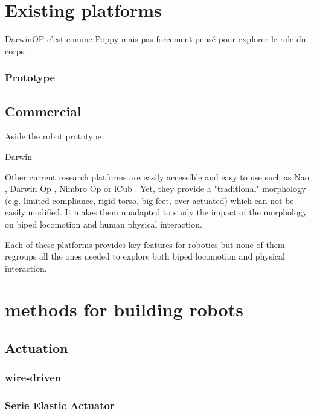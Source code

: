 \section{Existing platforms} %

DarwinOP c'est comme Poppy mais pas forcement pensé pour explorer le role du corps.

\subsubsection{Prototype} %

\subsection{Commercial} %

Aside the robot prototype,

Darwin \cite{ha2011development}

Other current research platforms are easily accessible and easy to use such as Nao \cite{gouaillier2008nao}, Darwin Op \cite{ha2011development}, Nimbro Op \cite{schwarznimbro} or iCub \cite{metta2008icub}. Yet, they provide a "traditional" morphology (e.g. limited compliance, rigid torso, big feet, over actuated) which can not be easily modified. It makes them unadapted to study the impact of the morphology on biped locomotion and human physical interaction.

Each of these platforms provides key features for robotics but none of them regroups all the ones needed to explore both biped locomotion and physical interaction.

\section{methods for building robots} %


\subsection{Actuation} %


\subsubsection{wire-driven} %

\subsubsection{Serie Elastic Actuator} %

